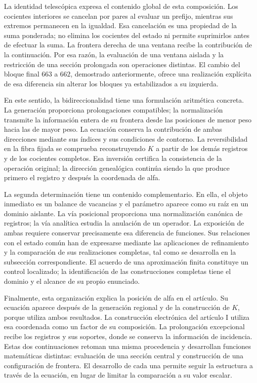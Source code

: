 La identidad telescópica expresa el contenido global de esta composición.
Los cocientes interiores se cancelan por pares al evaluar un prefijo,
mientras sus extremos permanecen en la igualdad. Esa cancelación es una
propiedad de la suma ponderada; no elimina los cocientes del estado ni
permite suprimirlos antes de efectuar la suma. La frontera derecha de una
ventana recibe la contribución de la continuación. Por esa razón, la
evaluación de una ventana aislada y la restricción de una sección
prolongada son operaciones distintas. El cambio del bloque final $663$ a
$662$, demostrado anteriormente, ofrece una realización explícita de esa
diferencia sin alterar los bloques ya estabilizados a su izquierda.

En este sentido, la bidireccionalidad tiene una formulación aritmética
concreta. La generación proporciona prolongaciones compatibles; la
normalización transmite la información entera de su frontera desde las
posiciones de menor peso hacia las de mayor peso. La ecuación conserva la
contribución de ambas direcciones mediante sus índices y sus condiciones
de contorno. La reversibilidad en la fibra fijada se comprueba reconstruyendo
$K$ a partir de los demás registros y de los cocientes completos. Esa
inversión certifica la consistencia de la operación original; la dirección
genealógica continúa siendo la que produce primero el registro y después
la coordenada de alfa.

La segunda determinación tiene un contenido complementario. En ella, el
objeto inmediato es un balance de vacancias y el parámetro aparece como
su raíz en un dominio aislante. La vía posicional proporciona una
normalización canónica de registros; la vía analítica estudia la anulación
de un operador. La exposición de ambas requiere conservar precisamente
esa diferencia de funciones. Sus relaciones con el estado común han de
expresarse mediante las aplicaciones de refinamiento y la comparación de
sus realizaciones completas, tal como se desarrolla en la subsección
correspondiente. El acuerdo de una aproximación finita constituye un
control localizado; la identificación de las construcciones completas
tiene el dominio y el alcance de su propio enunciado.

Finalmente, esta organización explica la posición de alfa en el artículo.
Su ecuación aparece después de la generación regional y de la construcción
de $K$, porque utiliza ambos resultados. La construcción electrónica del
artículo I utiliza esa coordenada como un factor de su composición. La prolongación
excepcional recibe los registros y sus soportes, donde se conserva la
información de incidencia. Estas dos continuaciones retoman una misma
procedencia y desarrollan funciones matemáticas distintas: evaluación de
una sección central y construcción de una configuración de frontera.
El desarrollo de cada una permite seguir la estructura a través de la
ecuación, en lugar de limitar la comparación a su valor escalar.
